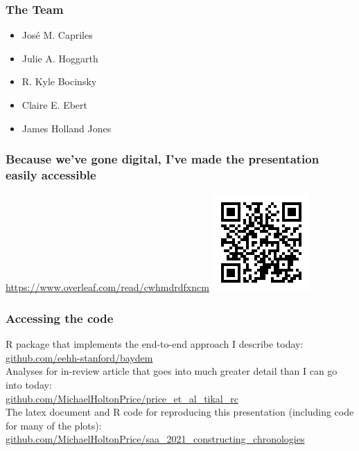 \documentclass{beamer}
\begin{document}
\begin{frame}[c]
    \frametitle{The Team}
    \begin{itemize}
      \item José M. Capriles
      \item Julie A. Hoggarth
      \item R. Kyle Bocinsky
      \item Claire E. Ebert
      \item James Holland Jones
  \end{itemize}
\end{frame}

\begin{frame}
  \frametitle{Because we've gone digital, I've made the presentation easily accessible}
  \centering
  \href{https://www.overleaf.com/read/cwhmdrdfxncm}{https://www.overleaf.com/read/cwhmdrdfxncm}
  \includegraphics[height=.85\textheight]{QR_Code_1616345765.png}
\end{frame}

\begin{frame}[c]
    \frametitle{Accessing the code}
      R package that implements the end-to-end approach I describe today:\\
      \href{https://github.com/eehh-stanford/baydem}{github.com/eehh-stanford/baydem}\\
      \bigskip
      Analyses for in-review article that goes into much greater detail than I can go into today:\\
      \href{https://github.com/MichaelHoltonPrice/price_et_al_tikal_rc}{github.com/MichaelHoltonPrice/price\_et\_al\_tikal\_rc}\\
      \bigskip
      The latex document and R code for reproducing this presentation (including code for many of the plots):\\
      \href{https://github.com/MichaelHoltonPrice/saa_2021_constructing_chronologies}{github.com/MichaelHoltonPrice/saa\_2021\_constructing\_chronologies}\\
      
\end{frame}
\end{document}
